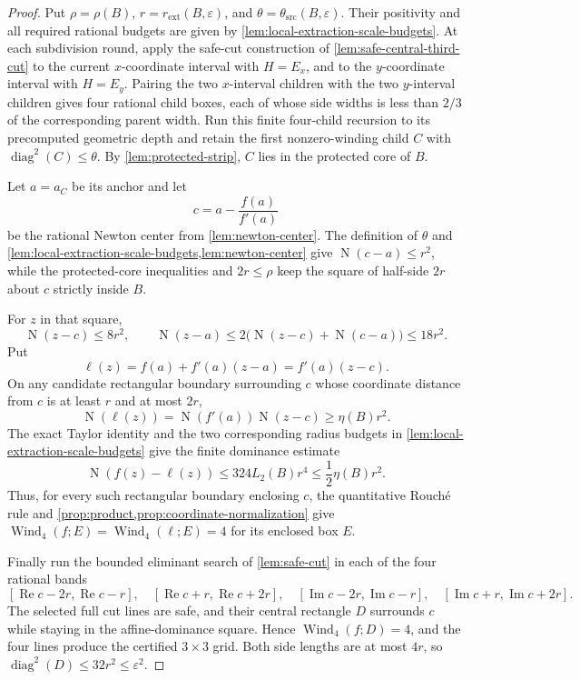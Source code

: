 \documentclass[11pt]{article}
\newcommand{\Norm}[1]{\operatorname{N}\!\left(#1\right)}
\newcommand{\Ree}{\operatorname{Re}}
\newcommand{\Imm}{\operatorname{Im}}
\newcommand{\Wind}{\operatorname{Wind}}
\newcommand{\diamq}{\operatorname{diag}^{2}}
\newcommand{\eps}{\varepsilon}
\begin{document}
\begin{proof}
Put $\rho=\rho(B)$, $r=r_{\mathrm{ext}}(B,\eps)$, and
$\theta=\theta_{\mathrm{src}}(B,\eps)$.  Their positivity and all required
rational budgets are given by \cref{lem:local-extraction-scale-budgets}.
At each subdivision round, apply the safe-cut construction of
\cref{lem:safe-central-third-cut} to the current $x$-coordinate interval with
$H=E_x$, and to the $y$-coordinate interval with $H=E_y$.  Pairing the two
$x$-interval children with the two $y$-interval children gives four rational
child boxes, each of whose side widths is less than $2/3$ of the corresponding
parent width.  Run this finite four-child recursion to its
precomputed geometric depth and retain the first nonzero-winding child $C$ with
$\diamq(C)\le\theta$.  By \cref{lem:protected-strip}, $C$ lies in the
protected core of $B$.

Let $a=a_C$ be its anchor and let
\[
             c=a-\frac{f(a)}{f'(a)}
\]
be the rational Newton center from \cref{lem:newton-center}.  The definition
of $\theta$ and \cref{lem:local-extraction-scale-budgets,lem:newton-center}
give $\Norm{c-a}\le r^2$, while the protected-core inequalities and
$2r\le\rho$ keep the square of half-side $2r$ about $c$ strictly inside $B$.

For $z$ in that square,
\[
 \Norm{z-c}\le8r^2,
 \qquad
 \Norm{z-a}\le2\bigl(\Norm{z-c}+\Norm{c-a}\bigr)\le18r^2.
\]
Put
\[
       \ell(z)=f(a)+f'(a)(z-a)=f'(a)(z-c).
\]
On any candidate rectangular boundary surrounding $c$ whose coordinate
distance from $c$ is at least $r$ and at most $2r$,
\[
       \Norm{\ell(z)}=\Norm{f'(a)}\Norm{z-c}\ge\eta(B) r^2.
\]
The exact Taylor identity and the two corresponding radius budgets in
\cref{lem:local-extraction-scale-budgets} give the finite dominance estimate
\[
 \Norm{f(z)-\ell(z)}
    \le324L_2(B)r^4
    \le\frac12\eta(B)r^2.
\]
Thus, for every such rectangular boundary enclosing $c$, the quantitative
Rouché rule and \cref{prop:product,prop:coordinate-normalization} give
$\Wind_4(f;E)=\Wind_4(\ell;E)=4$ for its enclosed box $E$.

Finally run the bounded eliminant search of \cref{lem:safe-cut} in each of
the four rational bands
\[
 [\Ree c-2r,\Ree c-r],\quad[\Ree c+r,\Ree c+2r],
 \quad[\Imm c-2r,\Imm c-r],\quad[\Imm c+r,\Imm c+2r].
\]
The selected full cut lines are safe, and their central rectangle $D$
surrounds $c$ while staying in the affine-dominance square.  Hence
$\Wind_4(f;D)=4$, and the four lines produce the certified $3\times3$ grid.
Both side lengths are at most $4r$, so
$\diamq(D)\le32r^2\le\eps^2$.
\end{proof}
\end{document}
